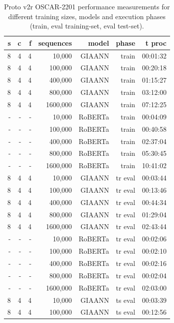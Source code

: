 \begin{table}[H]
\centering
\caption{Proto v2r OSCAR-2201 performance measurements for different training sizes, models and execution phases (train, eval training-set, eval test-set).}
\label{tab:protov2r-oscar-performance-models-inferenceLeakyIntegrateAndFire}
\begin{tabular}{rrrrrrr}
\toprule
\textbf{s} & \textbf{c} & \textbf{f} & \textbf{sequences} & \textbf{model} & \textbf{phase} & \textbf{t proc} \\
\midrule
8 & 4 & 4 & 10,000  & GIAANN  & train   & 00:01:32 \\
8 & 4 & 4 & 100,000 & GIAANN  & train   & 00:20:18 \\
8 & 4 & 4 & 400,000 & GIAANN  & train   & 01:15:27 \\
8 & 4 & 4 & 800,000 & GIAANN  & train   & 03:12:00 \\
8 & 4 & 4 & 1600,000 & GIAANN  & train  & 07:12:25 \\
- & - & - & 10,000  & RoBERTa & train   & 00:04:09 \\
- & - & - & 100,000 & RoBERTa & train   & 00:40:58 \\
- & - & - & 400,000 & RoBERTa & train   & 02:37:04 \\
- & - & - & 800,000 & RoBERTa & train   & 05:30:45 \\
- & - & - & 1600,000 & RoBERTa & train  & 10:41:02 \\
8 & 4 & 4 & 10,000  & GIAANN  & tr eval & 00:03:44 \\
8 & 4 & 4 & 100,000 & GIAANN  & tr eval & 00:13:46 \\
8 & 4 & 4 & 400,000 & GIAANN  & tr eval & 00:44:34 \\
8 & 4 & 4 & 800,000 & GIAANN  & tr eval & 01:29:04 \\
8 & 4 & 4 & 1600,000 & GIAANN  & tr eval & 02:43:44 \\
- & - & - & 10,000  & RoBERTa & tr eval & 00:02:06 \\
- & - & - & 100,000 & RoBERTa & tr eval & 00:02:10 \\
- & - & - & 400,000 & RoBERTa & tr eval & 00:02:16 \\
- & - & - & 800,000 & RoBERTa & tr eval & 00:02:04 \\
- & - & - & 1600,000 & RoBERTa & tr eval & 02:03:00 \\
8 & 4 & 4 & 10,000  & GIAANN  & ts eval & 00:03:39 \\
8 & 4 & 4 & 100,000 & GIAANN  & ts eval & 00:12:56 \\

\end{tabular}
\end{table}
